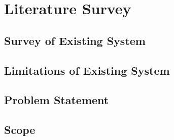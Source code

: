 \chapter{Literature Survey}

\section{Survey of Existing System }
\hspace{0.26in}


\section{Limitations of Existing System }
\hspace{0.26in}

\section{Problem Statement} 
\hspace{0.26in}

\section{Scope} 
\hspace{0.26in}

